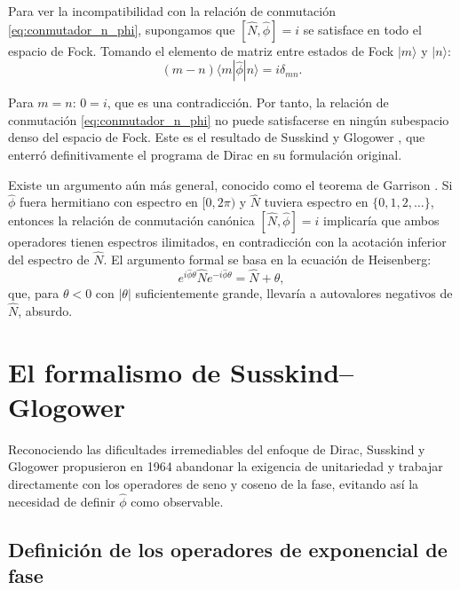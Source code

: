             Para ver la incompatibilidad con la relación de conmutación \eqref{eq:conmutador_n_phi}, supongamos que $[\hat{N}, \hat{\phi}] = i$ se satisface en todo el espacio de Fock. Tomando el elemento de matriz entre estados de Fock $|m\rangle$ y $|n\rangle$:
            \begin{equation}
                (m - n)\langle m|\hat{\phi}|n\rangle = i\delta_{mn}.
            \end{equation}
            
            Para $m = n$: $0 = i$, que es una contradicción. Por tanto, la relación de conmutación \eqref{eq:conmutador_n_phi} no puede satisfacerse en ningún subespacio denso del espacio de Fock. Este es el resultado de Susskind y Glogower \cite{Susskind1964}, que enterró definitivamente el programa de Dirac en su formulación original.
            
            Existe un argumento aún más general, conocido como el teorema de Garrison \cite{Garrison1970}. Si $\hat{\phi}$ fuera hermitiano con espectro en $[0, 2\pi)$ y $\hat{N}$ tuviera espectro en $\{0, 1, 2, \ldots\}$, entonces la relación de conmutación canónica $[\hat{N}, \hat{\phi}] = i$ implicaría que ambos operadores tienen espectros ilimitados, en contradicción con la acotación inferior del espectro de $\hat{N}$. El argumento formal se basa en la ecuación de Heisenberg:
            \begin{equation}
                e^{i\hat{\phi}\theta} \hat{N} e^{-i\hat{\phi}\theta} = \hat{N} + \theta,
            \end{equation}
            que, para $\theta < 0$ con $|\theta|$ suficientemente grande, llevaría a autovalores negativos de $\hat{N}$, absurdo.
 
    \section{El formalismo de Susskind--Glogower}
    
        Reconociendo las dificultades irremediables del enfoque de Dirac, Susskind y Glogower \cite{Susskind1964} propusieron en 1964 abandonar la exigencia de unitariedad y trabajar directamente con los operadores de seno y coseno de la fase, evitando así la necesidad de definir $\hat{\phi}$ como observable.
 
        \subsection{Definición de los operadores de exponencial de fase}
        
